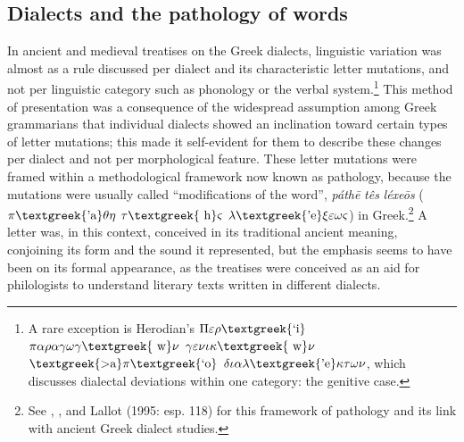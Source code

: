 \subsection{Dialects and the pathology of words}
\hypertarget{Toc19704844}{}\begin{styleCatalogusnotities}
In ancient and medieval treatises on the Greek dialects, linguistic variation was almost as a rule discussed per dialect and its characteristic letter mutations, and not per linguistic category such as phonology or the verbal system.\footnote{ \textrm{A rare exception is Herodian’s $\Pi \varepsilon \rho \text{\textgreek{`i}}$ $\pi \alpha \rho \alpha \gamma \omega \gamma \text{\textgreek{~w}}\nu $ $\gamma \varepsilon \nu \iota \kappa \text{\textgreek{~w}}\nu $ $\text{\textgreek{>a}}\pi \text{\textgreek{`o}}$ $\delta \iota \alpha \lambda \text{\textgreek{'e}}\kappa \tau \omega \nu $, which discusses dialectal deviations within one category: the genitive case.}} This method of presentation was a consequence of the widespread assumption among Greek grammarians that individual dialects showed an inclination toward certain types of letter mutations; this made it self-evident for them to describe these changes per dialect and not per morphological feature. These letter mutations were framed within a methodological framework now known as pathology, because the mutations were usually called “modifications of the word”, \textit{páthē} \textit{tês} \textit{léxeōs} ($\pi \text{\textgreek{'a}}\theta \eta $ $\tau \text{\textgreek{~h}}\varsigma $ $\lambda \text{\textgreek{'e}}\xi \varepsilon \omega \varsigma $) in Greek.\footnote{ \textrm{See \citet{Wackernagel1876}, \citet[150]{Siebenborn1976}, and Lallot (1995: esp. 118) for this framework of pathology and its link with ancient Greek dialect studies.}} A letter was, in this context, conceived in its traditional ancient meaning, conjoining its form and the sound it represented, but the emphasis seems to have been on its formal appearance, as the treatises were conceived as an aid for philologists to understand literary texts written in different dialects.
\end{styleCatalogusnotities}


